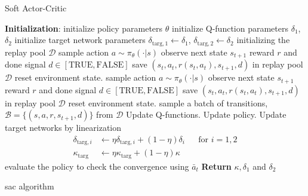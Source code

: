 \newpage
\begin{algorithm}[H]
	\caption{Soft Actor-Critic}
	\label{alg1}
	\begin{algorithmic}[1]
		\STATE \textbf{Initialization}: initialize policy parameters $\theta$
		\STATE initialize Q-function parameters $\delta_1$, $\delta_2$
		\STATE initialize target network parameters $\delta_{\text{targ},1} \leftarrow \delta_1$, $\delta_{\text{targ},2} \leftarrow \delta_2$
		\STATE initializing the replay pool $\mathcal{D}$
		\REPEAT
		\REPEAT
		\STATE  sample action $a \sim \pi_{\theta}(\cdot|s)$ 
		\STATE observe next state $s_{t+1}$ reward $r$ and done signal $d  \in [\text{TRUE},\text{FALSE}]$
		\STATE save $(s_t,a_t,r(s_t,a_t),s_{t+1},d)$ in replay pool $\mathcal{D}$
		\STATE reset environment state.
		\ENDIF
		\STATE  sample action $a \sim \pi_{\theta}(\cdot|s)$ 
		\STATE observe next state $s_{t+1}$ reward $r$ and done signal $d  \in [\text{TRUE},\text{FALSE}]$
		\STATE save $(s_t,a_t,r(s_t,a_t),s_{t+1},d)$ in replay pool $\mathcal{D}$
		\STATE reset environment state.
		\ENDIF
		\STATE sample a batch of transitions, $\mathcal{B} = \{ (s,a,r,s_{t+1},d) \}$ from $\mathcal{D}$
		\STATE Update Q-functions.
		\STATE Update policy.
		\STATE Update target networks by linearization 
		\begin{align*}
			\delta_{\text{targ},i} &\leftarrow \eta \delta_{\text{targ}, i} + (1-\eta) \delta_i && \text{for } i=1,2 \\
		\kappa_{\text{targ}}&\leftarrow \eta \kappa_{\text{targ}} + (1-\eta) \kappa
		\end{align*}
		\ENDFOR
		\ENDIF
		\STATE evaluate the policy to check the convergence using $\bar{a}_t$
		\STATE \textbf{Return} $\kappa, \delta_1$ and $\delta_2$
	\end{algorithmic}
	\caption{sac algorithm}
	\label{sac algorithm}
\end{algorithm}
